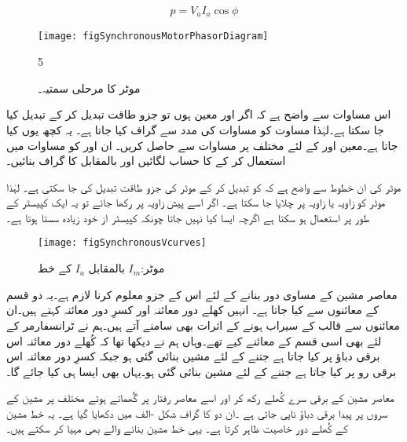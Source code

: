 \begin{align}\label{مساوات_معاصر_طاقت_برابر_دباؤ_رو_جزو_طاقت}
p=V_a I_a \cos \phi
\end{align}
%
\begin{figure}
\centering
\texttt{[image: figSynchronousMotorPhasorDiagram]}
\caption{موٹر کا مرحلی سمتیہ۔}
\label{شکل_معاصر_موٹر_کی_دوری_سمتیہ}
5\end{figure}
%
اس مساوات سے واضح ہے کہ اگر  اور  معین ہوں تو جزو طاقت تبدیل کر کے  تبدیل کیا جا سکتا ہے۔لہٰذا مساوت   کو مساوات   کی مدد سے گراف کیا جاتا ہے۔ یہ کچھ یوں کیا جاتا ہے۔معین  اور  کے لئے مختلف  پر مساوات    سے  حاصل کریں۔ ان  اور  کو مساوات   میں استعمال کر کے  کا حساب لگائیں اور  بالمقابل  کا گراف بنائیں۔

موٹر کی ان خطوط سے واضح ہے کہ  کو تبدیل کر کے موٹر کی جزو طاقت تبدیل کی جا سکتی ہے۔ لہٰذا موٹر کو  زاویہ یا  زاویہ  پر چلایا جا سکتا ہے۔ اگر اسے پیش زاویہ پر رکھا جائے تو یہ ایک کپیسٹر  کے طور پر استعمال ہو سکتا ہے اگرچہ ایسا کیا نہیں جاتا چونکہ کپیسٹر از خود  زیادہ سستا ہوتا ہے۔ 
\begin{figure}
\centering
\texttt{[image: figSynchronousVcurves]}
\caption{موٹر:$I_{m}$ بالمقابل $I_a$ کے خط}
\label{شکل_معاصر_برقی_رو_بالمقابل_برقی_دباؤ}
\end{figure}
معاصر مشین کے مساوی دور بنانے کے لئے اس کے جزو معلوم کرنا لازم ہے۔یہ دو قسم کے معائنوں سے کیا جاتا ہے۔ انہیں کھلے دور معائنہ اور کسرِ دور معائنہ کہتے ہیں۔ان معائنوں سے قالب کے سیراب ہونے کے اثرات بھی سامنے آتے ہیں۔ہم نے ٹرانسفارمر کے لئے بھی اسی قسم کے معائنے کیے تھے۔وہاں ہم نے دیکھا تھا کہ کُھلے دور معائنہ اس برقی دباؤ پر کیا جاتا ہے جتنے کے لئے مشین بنائی گئی ہو جبکہ کسرِ دور معائنہ اس برقی رو پر کیا جاتا ہے جتنے کے لئے مشین بنائی گئی ہو۔یہاں بھی ایسا ہی کیا جائے گا۔ 

معاصر مشین کے برقی سرے کُھلے رکھ کر اور اسے معاصر رفتار پر گُھماتے ہوئے مختلف  پر  مشین کے سروں پر پیدا برقی دباؤ  ناپی جاتی ہے ۔ان دو کا گراف شکل -الف میں دکھایا گیا ہے۔ یہ خط مشین کے کُھلے دور خاصیت ظاہر کرتا ہے۔ یہی خط مشین بنانے والے بھی مہیا کر سکتے ہیں۔

